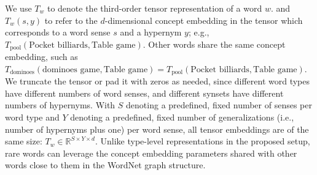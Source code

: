 We use $T_w$ to denote the third-order tensor representation of a word $w$.
and $T_w(s,y)$ to refer to the $d$-dimensional concept embedding in the tensor which corresponds to a word sense $s$ and a hypernym $y$; e.g., $T_{\text{pool}}(\text{Pocket billiards},\text{Table game})$.
Other words share the same concept embedding, such as $T_{\text{dominoes}}(\text{dominoes game},\text{Table game}) = T_{\text{pool}}(\text{Pocket billiards},\text{Table game})$.
We truncate the tensor or pad it with zeros as needed, since different word types have different numbers of word senses, and different synsets have different numbers of hypernyms. 
With $S$ denoting a predefined, fixed number of senses per word type and $Y$ denoting a predefined, fixed number of generalizations (i.e., number of hypernyms plus one) per word sense, all tensor embeddings are of the same size: $T_w \in \mathbb{R}^{S\times Y \times d}$.
Unlike type-level representations in the proposed setup, rare words can leverage the concept embedding parameters shared with other words close to them in the WordNet graph structure.

